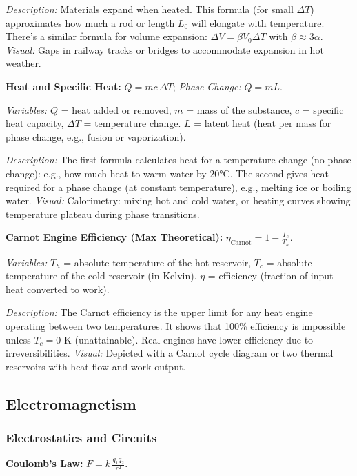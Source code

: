 \documentclass{article}
\begin{document}
\textit{Description:} Materials expand when heated. This formula (for small $\Delta T$) approximates how much a rod or length $L_0$ will elongate with temperature. There’s a similar formula for volume expansion: $\Delta V = \beta V_0 \Delta T$ with $\beta \approx 3\alpha$. \textit{Visual:} Gaps in railway tracks or bridges to accommodate expansion in hot weather.

\textbf{Heat and Specific Heat:} $Q = m c \,\Delta T$; \textit{Phase Change:} $Q = m L$.

\textit{Variables:} $Q$ = heat added or removed, $m$ = mass of the substance, $c$ = specific heat capacity, $\Delta T$ = temperature change. $L$ = latent heat (heat per mass for phase change, e.g., fusion or vaporization).

\textit{Description:} The first formula calculates heat for a temperature change (no phase change): e.g., how much heat to warm water by 20°C. The second gives heat required for a phase change (at constant temperature), e.g., melting ice or boiling water. \textit{Visual:} Calorimetry: mixing hot and cold water, or heating curves showing temperature plateau during phase transitions.

\textbf{Carnot Engine Efficiency (Max Theoretical):} $\displaystyle \eta_{\text{Carnot}} = 1 - \frac{T_c}{T_h}$.

\textit{Variables:} $T_h$ = absolute temperature of the hot reservoir, $T_c$ = absolute temperature of the cold reservoir (in Kelvin). $\eta$ = efficiency (fraction of input heat converted to work).

\textit{Description:} The Carnot efficiency is the upper limit for any heat engine operating between two temperatures. It shows that 100\% efficiency is impossible unless $T_c = 0$ K (unattainable). Real engines have lower efficiency due to irreversibilities. \textit{Visual:} Depicted with a Carnot cycle diagram or two thermal reservoirs with heat flow and work output.

\subsection*{Electromagnetism}

\subsubsection*{Electrostatics and Circuits}

\textbf{Coulomb’s Law:} $F = k\,\frac{q_1 q_2}{r^2}$.
\end{document}
